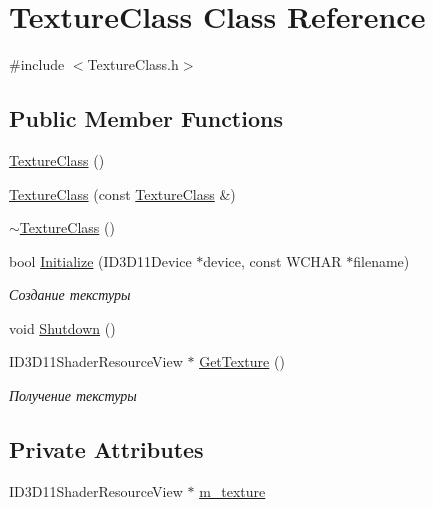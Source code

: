 \hypertarget{class_texture_class}{}\section{Texture\+Class Class Reference}
\label{class_texture_class}


{\ttfamily \#include $<$Texture\+Class.\+h$>$}

\subsection*{Public Member Functions}
\begin{DoxyCompactItemize}
\item 
\hyperlink{class_texture_class_a3ef8a8e22f2319b20f45f78b8b37f496}{Texture\+Class} ()
\item 
\hyperlink{class_texture_class_ae1a2a78cd218da2e31eb7754984c10a2}{Texture\+Class} (const \hyperlink{class_texture_class}{Texture\+Class} \&)
\item 
\hyperlink{class_texture_class_a990ce1e7783727cde9cb4a88a4281b08}{$\sim$\+Texture\+Class} ()
\item 
bool \hyperlink{class_texture_class_a1cbc48c69f24ce15a587b2c6e5fec5b6}{Initialize} (I\+D3\+D11\+Device $\ast$device, const W\+C\+H\+AR $\ast$filename)
\begin{DoxyCompactList}\small\item\em Создание текстуры \end{DoxyCompactList}\item 
void \hyperlink{class_texture_class_a9c9ca3b3b2b8cbe3d8b0f2bdfc498f20}{Shutdown} ()
\item 
I\+D3\+D11\+Shader\+Resource\+View $\ast$ \hyperlink{class_texture_class_a8250285fb8e8f3c595e83e529ba88fd6}{Get\+Texture} ()
\begin{DoxyCompactList}\small\item\em Получение текстуры \end{DoxyCompactList}\end{DoxyCompactItemize}
\subsection*{Private Attributes}
\begin{DoxyCompactItemize}
\item 
I\+D3\+D11\+Shader\+Resource\+View $\ast$ \hyperlink{class_texture_class_a9f4a1ba96054c4e3201e272cf7d1ae14}{m\+\_\+texture}
\end{DoxyCompactItemize}


